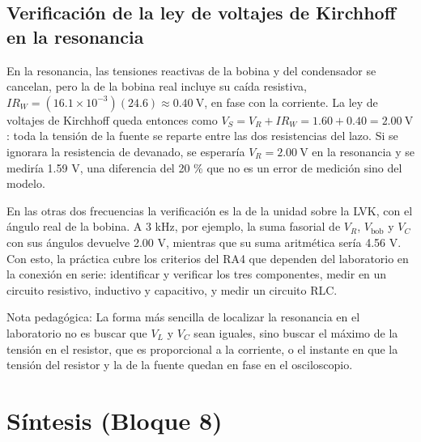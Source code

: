 \documentclass[11pt,letterpaper]{article}
\begin{document}
\subsection{Verificación de la ley de voltajes de Kirchhoff en la resonancia}

En la resonancia, las tensiones reactivas de la bobina y del condensador se cancelan, pero la de la bobina real incluye su caída resistiva, $I R_W = (16.1 \times 10^{-3})(24.6) \approx 0.40\ \text{V}$, en fase con la corriente. La ley de voltajes de Kirchhoff queda entonces como $V_S = V_R + I R_W = 1.60 + 0.40 = 2.00\ \text{V}$: toda la tensión de la fuente se reparte entre las dos resistencias del lazo. Si se ignorara la resistencia de devanado, se esperaría $V_R = 2.00\ \text{V}$ en la resonancia y se mediría 1.59 V, una diferencia del 20 \% que no es un error de medición sino del modelo.

En las otras dos frecuencias la verificación es la de la unidad sobre la LVK, con el ángulo real de la bobina. A 3 kHz, por ejemplo, la suma fasorial de $V_R$, $V_{\mathrm{bob}}$ y $V_C$ con sus ángulos devuelve 2.00 V, mientras que su suma aritmética sería 4.56 V. Con esto, la práctica cubre los criterios del RA4 que dependen del laboratorio en la conexión en serie: identificar y verificar los tres componentes, medir en un circuito resistivo, inductivo y capacitivo, y medir un circuito RLC.

\begin{nota}{Nota pedagógica:}
La forma más sencilla de localizar la resonancia en el laboratorio no es buscar que $V_L$ y $V_C$ sean iguales, sino buscar el máximo de la tensión en el resistor, que es proporcional a la corriente, o el instante en que la tensión del resistor y la de la fuente quedan en fase en el osciloscopio.
\end{nota}

\section{Síntesis (Bloque 8)}
\end{document}
